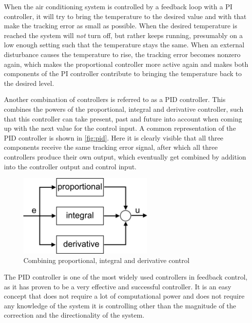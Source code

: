 When the air conditioning system is controlled by a feedback loop with a PI controller, it will try to bring the temperature to the desired value and with that make the tracking error as small as possible. When the desired temperature is reached the system will \emph{not} turn off, but rather keeps running, presumably on a low enough setting such that the temperature stays the same. When an external disturbance causes the temperature to rise, the tracking error becomes nonzero again, which makes the proportional controller more active again and makes both components of the PI controller contribute to bringing the temperature back to the desired level.

Another combination of controllers is referred to as a PID controller. This combines the powers of the proportional, integral and derivative controller, such that this controller can take present, past and future into account when coming up with the next value for the control input. A common representation of the PID controller is shown in \autoref{fig:pid}. Here it is clearly visible that all three components receive the same tracking error signal, after which all three controllers produce their own output, which eventually get combined by addition into the controller output and control input.

\begin{figure}[H]
	\begin{center}
		\includegraphics[width=0.60\textwidth]{figures/pid.png}
	\end{center}
	\caption{Combining proportional, integral and derivative control}
	\label{fig:pid}
\end{figure}

The PID controller is one of the most widely used controllers in feedback control, as it has proven to be a very effective and successful controller. It is an easy concept that does not require a lot of computational power and does not require any knowledge of the system it is controlling other than the magnitude of the correction and the directionality of the system.

